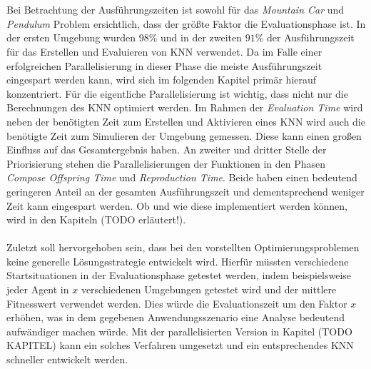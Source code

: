 \\\\
Bei Betrachtung der Ausführungszeiten ist sowohl für das \emph{Mountain Car} und \emph{Pendulum} Problem ersichtlich, dass der größte Faktor die Evaluationsphase ist. In der ersten Umgebung wurden $98\%$ und in der zweiten $91\%$ der Ausführungszeit für das Erstellen und Evaluieren von \ac{KNN} verwendet. Da im Falle einer erfolgreichen Parallelisierung in dieser Phase die meiste Ausführungszeit eingespart werden kann, wird sich im folgenden Kapitel primär hierauf konzentriert. Für die eigentliche Parallelisierung ist wichtig, dass nicht nur die Berechnungen des \ac{KNN} optimiert werden. Im Rahmen der \emph{Evaluation Time} wird neben der benötigten Zeit zum Erstellen und Aktivieren eines \ac{KNN} wird auch die benötigte Zeit zum Simulieren der Umgebung gemessen. Diese kann einen großen Einfluss auf das Gesamtergebnis haben. An zweiter und dritter Stelle der Priorisierung stehen die Parallelisierungen der Funktionen in den Phasen \emph{Compose Offspring Time} und \emph{Reproduction Time}. Beide haben einen bedeutend geringeren Anteil an der gesamten Ausführungszeit und dementsprechend weniger Zeit kann eingespart werden. Ob und wie diese implementiert werden können, wird in den Kapiteln (TODO erläutert!). %
\\\\
Zuletzt soll hervorgehoben sein, dass bei den vorstellten Optimierungsproblemen keine generelle Lösungsstrategie entwickelt wird. Hierfür müssten verschiedene Startsituationen in der Evaluationsphase getestet werden, indem beispielsweise jeder Agent in $x$ verschiedenen Umgebungen getestet wird und der mittlere Fitnesswert verwendet werden. Dies würde die Evaluationszeit um den Faktor $x$ erhöhen, was in dem gegebenen Anwendungsszenario eine Analyse bedeutend aufwändiger machen würde. Mit der parallelisierten Version in Kapitel (TODO KAPITEL) kann ein solches Verfahren umgesetzt und ein entsprechendes \ac{KNN} schneller entwickelt werden.

